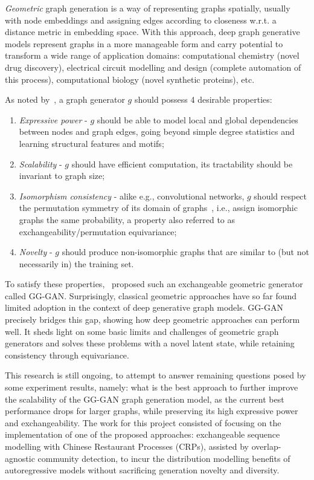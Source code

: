\emph{Geometric} graph generation is a way of representing graphs spatially, usually with node embeddings and assigning edges according to closeness w.r.t. a distance metric in embedding space. With this approach, deep graph generative models represent graphs in a more manageable form and carry potential to transform a wide range of application domains: computational chemistry (novel drug discovery), electrical circuit modelling and design (complete automation of this process), computational biology (novel synthetic proteins), etc.

As noted by~\cite{krawczuk_gg-gan_2020}, a graph generator $g$ should possess 4 desirable properties:
\begin{enumerate}[1.]
\item \emph{Expressive power} - $g$ should be able to model local and global dependencies between nodes and graph edges, going beyond simple degree statistics and learning structural features and motifs;
\item \emph{Scalability} - $g$ should have efficient computation, its tractability should be invariant to graph size;
\item \emph{Isomorphism consistency} - alike e.g., convolutional networks, $g$ should respect the permutation symmetry of its domain of graphs~\cite{bronstein_geometric_2021}, i.e., assign isomorphic graphs the same probability, a property also referred to as exchangeability/permutation equivariance;
\item \emph{Novelty} - $g$ should produce non-isomorphic graphs that are similar to (but not necessarily in) the training set.
\end{enumerate}

To satisfy these properties,~\cite{krawczuk_gg-gan_2020} proposed such an exchangeable geometric generator called GG-GAN. Surprisingly, classical geometric approaches have so far found limited adoption in the context of deep generative graph models. GG-GAN precisely bridges this gap, showing how deep geometric approaches can perform well. It sheds light on some basic limits and challenges of geometric graph generators and solves these problems with a novel latent state, while retaining consistency through equivariance.

This research is still ongoing, to attempt to answer remaining questions posed by some experiment results, namely: what is the best approach to further improve the scalability of the GG-GAN graph generation model, as the current best performance drops for larger graphs, while preserving its high expressive power and exchangeability. The work for this project consisted of focusing on the implementation of one of the proposed approaches: exchangeable sequence modelling with Chinese Restaurant Processes (CRPs), assisted by overlap-agnostic community detection, to incur the distribution modelling benefits of autoregressive models without sacrificing generation novelty and diversity. 

